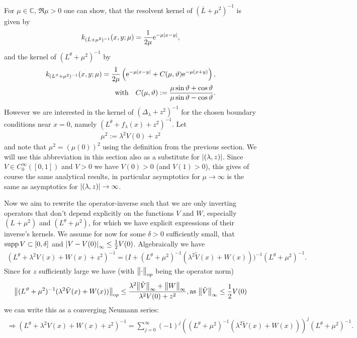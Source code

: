 For $\mu\in\mathbb{C}$, $\Re\mu > 0$ one can show, that the resolvent kernel of
$(\bar L + \mu^2)^{-1}$ is given by
\begin{align}
  k_{(\bar L + \mu^2)^{-1}}(x,y;\mu) = \frac1{2\mu}\mathrm e^{-\mu\left|x-y\right|},
\end{align}
and the kernel of $(L^\theta+\mu^2)^{-1}$ by
\begin{align}
  \label{frm:k-l-theta}
  k_{(L^\vartheta +\mu^2)^{-1}}(x,y;\mu) = \frac1{2\mu} \left( \mathrm e^{-\mu\left|x-y\right|} +
  C(\mu,\vartheta)\mathrm e^{-\mu(x+y)}\right), \\
  \label{frm:c-mu-theta}
  \text{with} \quad C(\mu,\vartheta) :=
  \frac{\mu\sin\vartheta+\cos\vartheta}{\mu\sin\vartheta-\cos\vartheta}.
\end{align}
However we are interested in the kernel of $(\Delta_\lambda + z^2)^{-1}$ for the
chosen boundary conditions near $x = 0$, namely $(L^\theta + f_\lambda(x) +
z^2)^{-1}$. Let
\begin{align*}
  \mu^2 := \lambda^2 V(0) + z^2
\end{align*}
and note that $\mu^2 = (\mu(0))^2$ using the definition from the previous
section. We will use this abbreviation in this section also as a substitute for
$\left|(\lambda,z)\right|$. Since $V\in C_0^\infty([0,1])$ and $V > 0$ we have $V(0) >
0$ (and $V(1) > 0$), this gives of course the same analytical results, in
particular asymptotics for $\mu\to\infty$ is the same as asymptotics for
$\left|(\lambda,z)\right|\to\infty$.

Now we aim to rewrite the operator-inverse such that we are only inverting
operators that don't depend explicitly on the functions $V$ and $W$, especially
$(L+\mu^2)$ and $(L^\theta+\mu^2)$, for which we have explicit expressions of
their inverse's kernels. We assume for now for some $\delta > 0$ sufficiently
small, that $\operatorname{supp} V \subset [0,\delta]$ and $\left|V-V(0)\right|_{\infty}\leq
\frac12V(0)$. Algebraically we have
\begin{align*}
  (L^\theta + \lambda^2 V(x) + W(x) + z^2)^{-1} =
    \bigl(I + (L^\theta + \mu^2)^{-1}(\lambda^2\tilde V(x) + W(x))\bigr)^{-1}
    (L^\theta + \mu^2)^{-1}.
\end{align*}
Since for $z$ sufficiently large we have (with $\bigl\|\cdot\bigr\|_{\mathrm op}$ being the
operator norm)
\begin{align*}
  \bigl\|(L^\vartheta + \mu^2)^{-1}(\lambda^2\tilde V(x) + W(x))\bigr\|_{\mathrm op} \leq
  \frac{\lambda^2\bigl\|\tilde V\bigr\|_{\infty} + \bigl\|W\bigr\|_{\infty}}{\lambda^2 V(0) + z^2},
  \text{as } \bigl\|\tilde V\bigr\|_{\infty} \leq \frac12V(0)
\end{align*}
we can write this as a converging Neumann series:
\begin{align}
  \label{frm:neumann-sum}
  \Rightarrow (L^\theta + \lambda^2 V(x) + W(x) + z^2)^{-1} =
    \sum_{j=0}^\infty (-1)^j \left((L^\theta + \mu^2)^{-1}(\lambda^2\tilde V(x)
    + W(x))\right)^j (L^\theta + \mu^2)^{-1}.
\end{align}

